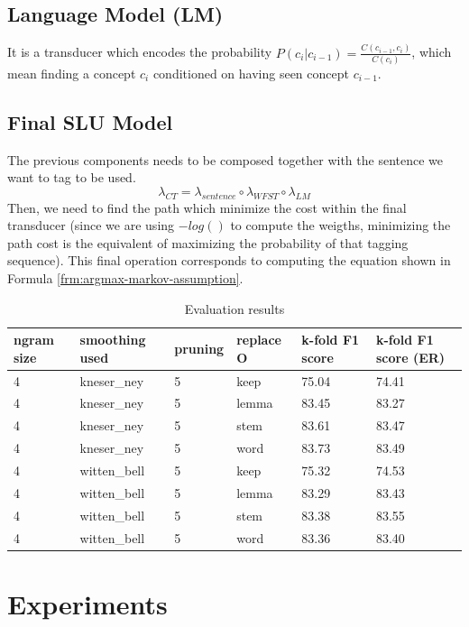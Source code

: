 \documentclass[11pt,a4paper]{article}
\begin{document}
\subsection{Language Model (LM)}
It is a transducer which encodes the probability $P(c_i|c_{i-1}) = \frac{C(c_{i-1}, c_i)}{C(c_i)}$, which mean finding a concept $c_i$ conditioned on having seen concept $c_{i-1}$. 

\subsection{Final SLU Model}

The previous components needs to be composed together with the sentence we want to tag to be used.
\begin{equation}
\lambda_{CT} = \lambda_{sentence} \circ \lambda_{WFST} \circ \lambda_{LM}
\end{equation}
Then, we need to find the path which minimize the cost within the final transducer (since we are using $-log()$ to compute the weigths, minimizing the path cost is the equivalent of maximizing the probability of that tagging sequence). This final operation corresponds to computing the equation shown in Formula \ref{frm:argmax-markov-assumption}.

\begin{table}[th!]
\centering
\caption{Evaluation results}
\label{tab:eval-resuts}
\begin{tabular}{llllll}
\hline
\textbf{ngram size} & \textbf{smoothing used} & \textbf{pruning} & \textbf{replace O} & \textbf{k-fold F1 score} & \textbf{k-fold F1 score (ER)} \\ \hline
4 & kneser\_ney & 5 & keep & 75.04 & 74.41 \\
4 & kneser\_ney & 5 & lemma & 83.45 & 83.27 \\
4 & kneser\_ney & 5 & stem & 83.61 & 83.47 \\
4 & kneser\_ney & 5 & word & 83.73 & 83.49 \\
4 & witten\_bell & 5 & keep & 75.32 & 74.53 \\
4 & witten\_bell & 5 & lemma & 83.29 & 83.43 \\
4 & witten\_bell & 5 & stem & 83.38 & 83.55 \\
4 & witten\_bell & 5 & word & 83.36 & 83.40 \\ \hline
\end{tabular}
\end{table}

\section{Experiments}
\end{document}
